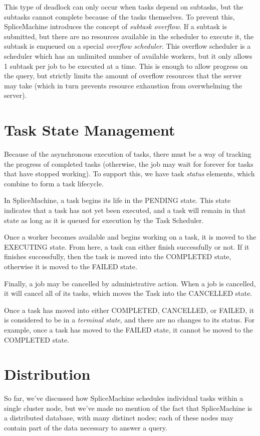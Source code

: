 This type of deadlock can only occur when tasks depend on subtasks, but the subtasks cannot complete because of the tasks themselves. To prevent this, SpliceMachine introduces the concept of \emph{subtask overflow}. If a subtask is submitted, but there are no resources available in the scheduler to execute it, the subtask is enqueued on a special \emph{overflow scheduler}. This overflow scheduler is a scheduler which has an unlimited number of available workers, but it only allows 1 subtask per job to be executed at a time. This is enough to allow progress on the query, but strictly limits the amount of overflow resources that the server may take (which in turn prevents resource exhaustion from overwhelming the server). 

\section{Task State Management}
Because of the asynchronous execution of tasks, there must be a way of tracking the progress of completed tasks (otherwise, the job may wait for forever for tasks that have stopped working). To support this, we have task \emph{status} elements, which combine to form a task lifecycle.

In SpliceMachine, a task begins its life in the PENDING state. This state indicates that a task has not yet been executed, and a task will remain in that state as long as it is queued for execution by the Task Scheduler.

Once a worker becomes available and begins working on a task, it is moved to the EXECUTING state. From here, a task can either finish successfully or not. If it finishes successfully, then the task is moved into the COMPLETED state, otherwise it is moved to the FAILED state.

Finally, a job may be cancelled by administrative action. When a job is cancelled, it will cancel all of its tasks, which moves the Task into the CANCELLED state. 

Once a task has moved into either COMPLETED, CANCELLED, or FAILED, it is considered to be in a \emph{terminal state}, and there are no changes to its status. For example, once a task has moved to the FAILED state, it cannot be moved to the COMPLETED state.

\section{Distribution}
So far, we've discussed how SpliceMachine schedules individual tasks within a single cluster node, but we've made no mention of the fact that SpliceMachine is a distributed database, with many distinct nodes; each of these nodes may contain part of the data necessary to answer a query.

